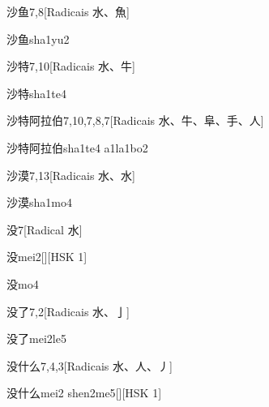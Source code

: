 \begin{entry}{沙鱼}{7,8}[Radicais ⽔、⿂]
  \begin{phonetics}{沙鱼}{sha1yu2}
  \end{phonetics}
\end{entry}

\begin{entry}{沙特}{7,10}[Radicais ⽔、⽜]
  \begin{phonetics}{沙特}{sha1te4}
  \end{phonetics}
\end{entry}

\begin{entry}{沙特阿拉伯}{7,10,7,8,7}[Radicais ⽔、⽜、⾩、⼿、⼈]
  \begin{phonetics}{沙特阿拉伯}{sha1te4 a1la1bo2}
  \end{phonetics}
\end{entry}

\begin{entry}{沙漠}{7,13}[Radicais ⽔、⽔]
  \begin{phonetics}{沙漠}{sha1mo4}
  \end{phonetics}
\end{entry}

\begin{entry}{没}{7}[Radical ⽔]
  \begin{phonetics}{没}{mei2}[][HSK 1]
  \end{phonetics}
  \begin{phonetics}{没}{mo4}
  \end{phonetics}
\end{entry}

\begin{entry}{没了}{7,2}[Radicais ⽔、⼅]
  \begin{phonetics}{没了}{mei2le5}
  \end{phonetics}
\end{entry}

\begin{entry}{没什么}{7,4,3}[Radicais ⽔、⼈、⼃]
  \begin{phonetics}{没什么}{mei2 shen2me5}[][HSK 1]
  \end{phonetics}
\end{entry}

